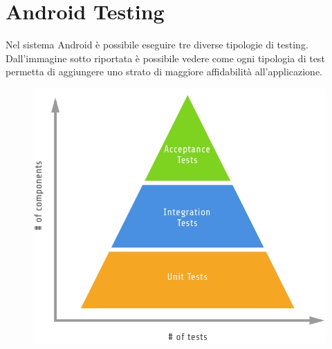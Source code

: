 \documentclass[12pt]{report}
\begin{document}
\section{Android Testing}

Nel sistema Android è possibile eseguire tre diverse tipologie di testing. Dall'immagine sotto riportata è possibile vedere come ogni tipologia di test permetta di aggiungere uno strato di maggiore affidabilità all'applicazione.
\newpage
\begin{figure}[!h]
	\centering
	\includegraphics[width=0.5\linewidth]{immagini/testing_piramide}
	\caption{}
	\label{fig:testingpiramide}
\end{figure}
\end{document}
